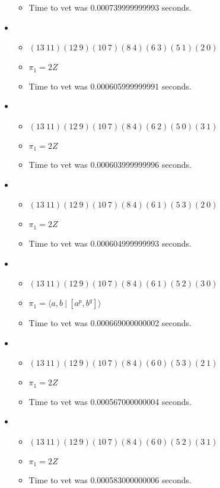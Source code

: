 \documentclass{article}
\begin{document}
\begin{itemize}
\begin{itemize}
      \item Time to vet was 0.000739999999993 seconds.
\end{itemize}
\item \begin{itemize}
      \item $(13\ 11)(12\ 9)(10\ 7)(8\ 4)(6\ 3)(5\ 1)(2\ 0)$
      \item $\pi_1 =2 Z$
      \item Time to vet was 0.000605999999991 seconds.
\end{itemize}
\item \begin{itemize}
      \item $(13\ 11)(12\ 9)(10\ 7)(8\ 4)(6\ 2)(5\ 0)(3\ 1)$
      \item $\pi_1 =2 Z$
      \item Time to vet was 0.000603999999996 seconds.
\end{itemize}
\item \begin{itemize}
      \item $(13\ 11)(12\ 9)(10\ 7)(8\ 4)(6\ 1)(5\ 3)(2\ 0)$
      \item $\pi_1 =2 Z$
      \item Time to vet was 0.000604999999993 seconds.
\end{itemize}
\item \begin{itemize}
      \item $(13\ 11)(12\ 9)(10\ 7)(8\ 4)(6\ 1)(5\ 2)(3\ 0)$
      \item $\pi_1 = \langle a,b\ |\ [a^p,b^q]\rangle$
      \item Time to vet was 0.000669000000002 seconds.
\end{itemize}
\item \begin{itemize}
      \item $(13\ 11)(12\ 9)(10\ 7)(8\ 4)(6\ 0)(5\ 3)(2\ 1)$
      \item $\pi_1 =2 Z$
      \item Time to vet was 0.000567000000004 seconds.
\end{itemize}
\item \begin{itemize}
      \item $(13\ 11)(12\ 9)(10\ 7)(8\ 4)(6\ 0)(5\ 2)(3\ 1)$
      \item $\pi_1 =2 Z$
      \item Time to vet was 0.000583000000006 seconds.

\end{itemize}
\end{itemize}
\end{document}
